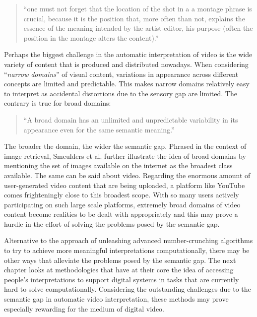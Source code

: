 \begin{quote}
  ``one must not forget that the location of the shot in a a montage phrase is crucial, because it is the position that, more often than not, explains the essence of the meaning intended by the artist-editor, his purpose (often the position in the montage alters the content).''\cite[``The Principles of Montage'']{kuleshov1974kuleshov}
\end{quote}

Perhaps the biggest challenge in the automatic interpretation of video is the wide variety of content that is produced and distributed nowadays. When considering ``\emph{narrow domains}'' of visual content, variations in appearance across different concepts are limited and predictable\cite{Smeulders:2000tx}. This makes narrow domains relatively easy to interpret as accidental distortions due to the sensory gap are limited. The contrary is true for broad domains:

\begin{quote}
  ``A broad domain has an unlimited and unpredictable variability in its appearance even for the same semantic meaning.''\cite{Smeulders:2000tx}
\end{quote}

The broader the domain, the wider the semantic gap. Phrased in the context of image retrieval, Smeulders et al. further illustrate the idea of broad domains by mentioning the set of images available on the internet as the broadest class available. The same can be said about video. Regarding the enormous amount of user-generated video content that are being uploaded, a platform like YouTube comes frighteningly close to this broadest scope. With so many users actively participating on such large scale platforms, extremely broad domains of video content become realities to be dealt with appropriately and this may prove a hurdle in the effort of solving the problems posed by the semantic gap.

Alternative to the approach of unleashing advanced number-crunching algorithms to try to achieve more meaningful interpretations computationally, there may be other ways that alleviate the problems posed by the semantic gap. The next chapter looks at methodologies that have at their core the idea of accessing people's interpretations to support digital systems in tasks that are currently hard to solve computationally. Considering the outstanding challenges due to the semantic gap in automatic video interpretation, these methods may prove especially rewarding for the medium of digital video.

